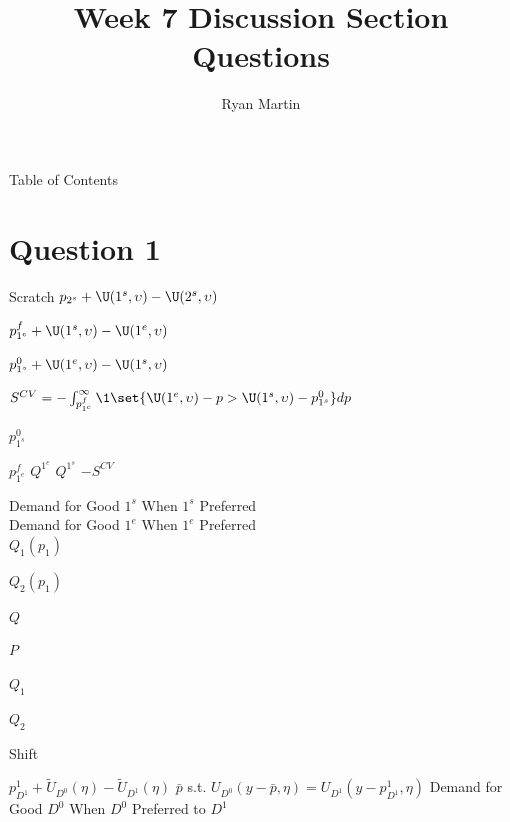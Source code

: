 \documentclass[xcolor={dvipsnames}]{beamer}
\title{ Week 7 Discussion Section Questions}
\author{Ryan Martin}
\begin{document}
	\begin{frame}{Table of Contents}
		\tableofcontents
	\end{frame}

	\section{Question 1}

		
	\begin{frame}[allowframebreaks]{Scratch}
	$p_{2^s} + \U(1^s, \upsilon) - \U(2^s, \upsilon)$
	
	$p_{1^e}^f + \U(1^s, \upsilon) - \U(1^e, \upsilon)$
	
	$p_{1^s}^0 + \U(1^e, \upsilon) - \U(1^s, \upsilon)$
	
	
	$S^{CV}=-\int_{p_{1^e}^f}^\infty \1\set{\U(1^e, \upsilon) - p > \U(1^s, \upsilon) - p_{1^s}^0}dp$
	
	$p_{1^s}^0$
	
	$p_{1^e}^f$
	$Q^{1^e}$
	$Q^{1^s}$
	$-S^{CV}$
	
	Demand for Good $1^s$ When $1^s$ Preferred \\
	Demand for Good $1^e$ When $1^e$ Preferred \\
	
	
	
	$Q_1(p_1)$
	
	$Q_2(p_1)$
	
	$Q$
	
	$P$
	
	$Q_1$
	
	$Q_2$
	
	
	
	Shift
	\end{frame}


\begin{frame}[allowframebreaks]
	$p_{D^1}^1 + \tilde{U}_{D^0}(\eta) - \tilde{U}_{D^1}(\eta)$
	$\bar{p}$ s.t. $U_{D^0}(y - \bar{p}, \eta) = U_{D^1}(y - p_{D^1}^1, \eta)$
	Demand for Good $D^0$ When $D^0$ Preferred to $D^1$
	
	\end{frame}
	
\end{document}
